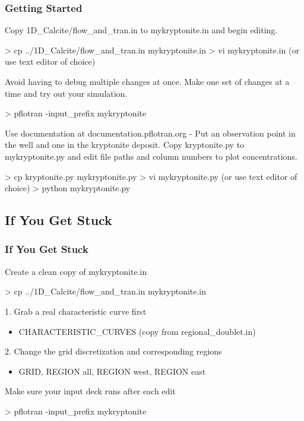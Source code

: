 \documentclass{beamer}
\newcommand\bluecomment[1]{{{\color{blue} #1}}}
\begin{document}
\begin{frame}[fragile]\frametitle{Getting Started}
Copy 1D\_Calcite/flow\_and\_tran.in to mykryptonite.in and begin editing.
\begin{semiverbatim}
  > cp ../1D\_Calcite/flow\_and\_tran.in mykryptonite.in
  > vi mykryptonite.in \bluecomment{(or use text editor of choice)}
\end{semiverbatim}
Avoid having to debug multiple changes at once. Make one set of changes at a time and try out your simulation.
\begin{semiverbatim}
  > pflotran -input\_prefix mykryptonite
\end{semiverbatim}
Use documentation at \bluecomment{documentation.pflotran.org}
-
Put an observation point in the well and one in the kryptonite deposit. Copy kryptonite.py to mykryptonite.py and edit file paths and column numbers to plot concentrations.
\begin{semiverbatim}
  > cp kryptonite.py mykryptonite.py
  > vi mykryptonite.py \bluecomment{(or use text editor of choice)}
  > python mykryptonite.py
\end{semiverbatim}

\end{frame}

\subsection{If You Get Stuck}

\begin{frame}[fragile]\frametitle{If You Get Stuck}
Create a clean copy of mykryptonite.in
\begin{semiverbatim}
  > cp ../1D\_Calcite/flow\_and\_tran.in mykryptonite.in
\end{semiverbatim}
1. Grab a real characteristic curve first
\begin{itemize}\small
  \item{CHARACTERISTIC\_CURVES (copy from regional\_doublet.in)}
\end{itemize}
2. Change the grid discretization and corresponding regions
\begin{itemize}\small
  \item{GRID, REGION all, REGION west, REGION east}
\end{itemize}
Make sure your input deck runs after each edit
\begin{semiverbatim}
  > pflotran -input\_prefix mykryptonite
\end{semiverbatim}
\end{frame}
\end{document}
